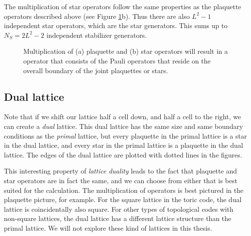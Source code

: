The multiplication of star operators follow the same properties as the plaquette operators described above (see Figure \ref{sf:fig_multistab}b). Thus there are also $L^2 - 1$ independent star operators, which are the star generators. This sums up to $N_S = 2L^2 - 2$ independent stabilizer generators.

\begin{figure}
  \centering
  \hspace{1cm}
  \caption{Multiplication of (a) plaquette and (b) star operators will result in a operator that consists of the Pauli operators that reside on the overall boundary of the joint plaquettes or stars. }\label{sf:fig_multistab}
\end{figure}

\subsection{Dual lattice}
Note that if we shift our lattice half a cell down, and half a cell to the right, we can create a \emph{dual} lattice. This dual lattice has the same size and same boundary conditions as the \emph{primal} lattice, but every plaquette in the primal lattice is a star in the dual lattice, and every star in the primal lattice is a plaquette in the dual lattice. The edges of the dual lattice are plotted with dotted lines in the figures.

This interesting property of \emph{lattice duality} leads to the fact that plaquette and star operators are in fact the same, and we can choose from either that is best suited for the calculation. The multiplication of operators is best pictured in the plaquette picture, for example. For the square lattice in the toric code, the dual lattice is coincidentally also square. For other types of topological codes with non-square lattices, the dual lattice has a different lattice structure than the primal lattice. We will not explore these kind of lattices in this thesis.

